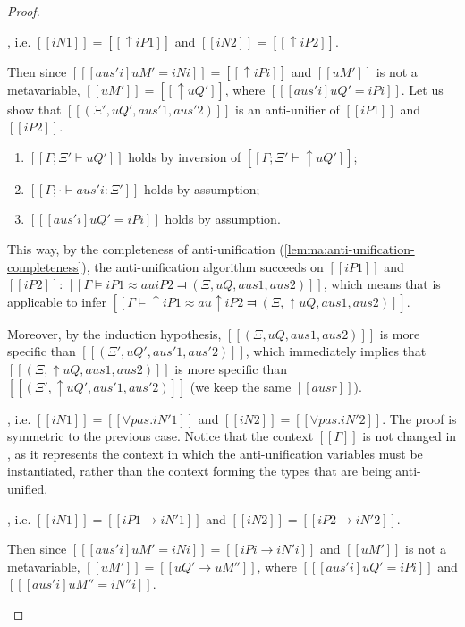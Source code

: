 \begin{proof}
\begin{caseof}
        \item {}, i.e. 
        $[[iN1]] = [[↑iP1]]$ and $[[iN2]] = [[↑iP2]]$.
        \label{case:anti-unification-initial:shiftu}

        Then since $[[ [aus'i] uM' = iNi ]] = [[↑iPi]]$ and $[[uM']]$ is not a metavariable,
        $[[uM']] = [[↑uQ']]$, where $[[ [aus'i] uQ' = iPi ]]$. 
        Let us show that $[[(Ξ', uQ', aus'1, aus'2)]]$ 
        is an anti-unifier of $[[iP1]]$ and $[[iP2]]$.
        \begin{enumerate}
            \item $[[Γ ; Ξ' ⊢ uQ']]$ holds by inversion of $[[Γ ; Ξ' ⊢ ↑uQ']]$;
            \item $[[Γ ; · ⊢ aus'i : Ξ']]$ holds by assumption;
            \item $[[ [aus'i] uQ' = iPi ]]$ holds by assumption.
        \end{enumerate}

        This way, by the completeness of anti-unification 
        (\cref{lemma:anti-unification-completeness}),
        the anti-unification algorithm succeeds on $[[iP1]]$ and $[[iP2]]$:
        $[[Γ ⊨ iP1 ≈au iP2 ⫤ (Ξ, uQ, aus1, aus2)]]$,
        which means that  is applicable to infer 
        $[[Γ ⊨ ↑iP1 ≈au ↑iP2 ⫤ (Ξ, ↑uQ, aus1, aus2)]]$.

        Moreover, by the induction hypothesis,
        $[[(Ξ, uQ, aus1, aus2)]]$ is more specific than $[[(Ξ', uQ', aus'1, aus'2)]]$,
        which immediately implies that $[[(Ξ, ↑uQ, aus1, aus2)]]$ is more specific than
        $[[(Ξ', ↑uQ', aus'1, aus'2)]]$ (we keep the same $[[ausr]]$).

        \item {}, i.e. 
        $[[iN1]] = [[∀pas.iN'1]]$ and $[[iN2]] = [[∀pas.iN'2]]$.
        \label{case:anti-unification-initial:forall}
        The proof is symmetric to the previous case.
        Notice that the context $[[Γ]]$ is not changed in , 
        as it represents the context in which the anti-unification variables must be instantiated,
        rather than the context forming the types that are being anti-unified.

        \item {}, i.e.
        $[[iN1]] = [[iP1 → iN'1]]$ and $[[iN2]] = [[iP2 → iN'2]]$.

        Then since $[[ [aus'i] uM' = iNi ]] = [[iPi → iN'i]]$ and $[[uM']]$ is not a metavariable,
        $[[uM']] = [[uQ' → uM'']]$, where $[[ [aus'i] uQ' = iPi ]]$ and $[[ [aus'i] uM'' = iN''i ]]$.


\end{caseof}
\end{proof}
